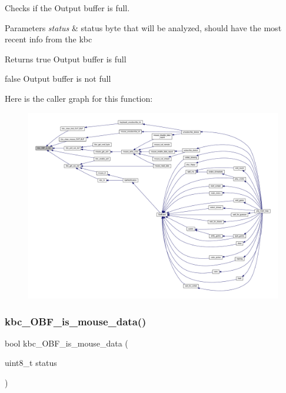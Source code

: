 Checks if the Output buffer is full. 


\begin{DoxyParams}{Parameters}
{\em status} & status byte that will be analyzed, should have the most recent info from the kbc \\
\hline
\end{DoxyParams}
\begin{DoxyReturn}{Returns}
true Output buffer is full 

false Output buffer is not full 
\end{DoxyReturn}
Here is the caller graph for this function\+:\nopagebreak
\begin{figure}[H]
\begin{center}
\leavevmode
\includegraphics[width=350pt]{group__keyboard_ga4e0b2a8300752760d8c7f10fcb55b67a_icgraph}
\end{center}
\end{figure}
\mbox{\label{group__keyboard_ga559aca235f02f3322fe738495efdd0e0}} 
\subsubsection{\texorpdfstring{kbc\+\_\+\+O\+B\+F\+\_\+is\+\_\+mouse\+\_\+data()}{kbc\_OBF\_is\_mouse\_data()}}
{\footnotesize\ttfamily bool kbc\+\_\+\+O\+B\+F\+\_\+is\+\_\+mouse\+\_\+data (\begin{DoxyParamCaption}\item[{uint8\+\_\+t}]{status }\end{DoxyParamCaption})}



